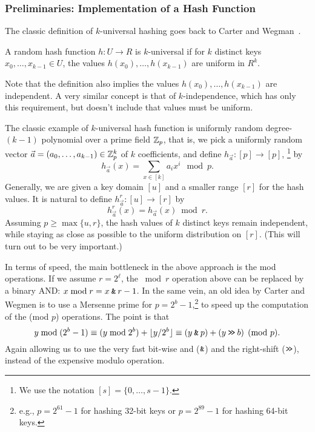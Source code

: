 \subsubsection{Preliminaries: Implementation of a Hash Function}
The classic definition of $k$-universal hashing
goes back to Carter and Wegman~\cite{wegman81kwise}.
\begin{definition}
   A random hash function $h:U\to R$ is $k$-universal if for $k$
   distinct keys $x_0,\ldots,x_{k-1}\in U$, the values
   $h(x_0),\ldots,h(x_{k-1})$ are uniform in $R^k$.
\end{definition}
\noindent
Note that the definition also implies the values 
$h(x_0),\ldots,h(x_{k-1})$ are independent.
A very similar concept is that of $k$-independence, which has only this requirement, but doesn't include that values must be uniform.

The classic example of $k$-universal
hash function is uniformly random degree-$(k-1)$ polynomial over a prime field
$\mathbb Z_p$, that is, we pick a uniformly random vector
$\vec a=(a_0,\ldots,a_{k-1})\in \mathbb Z_p^k$ of $k$ coefficients, and define
$h_{\vec a}:[p]\to[p]$,
\footnote{ We use the notation $[s]=\{0,\ldots,s-1\}$.  }
   by 
\[h_{\vec a}(x)=\sum_{x\in[k]}a_i x^i \mod p.\]
%
Generally, we are given a key domain $[u]$ and a smaller range $[r]$ for the hash values.
It is natural to define
$h^r_{\vec a}:[u]\to[r]$ by
\[h^r_{\vec a}(x)=h_{\vec a}(x)\bmod r.\]
Assuming $p\geq \max\{u,r\}$, the hash values of $k$ distinct keys remain independent,
while staying as close as possible to the uniform distribution on $[r]$.
(This will turn out to be very important.)

In terms of speed, the main bottleneck in the above approach is the mod operations.
If we assume $r=2^\ell$, the $\bmod r$ operation above can be replaced by a binary AND: $x \bmod r = x \mathbin{\texttt{\&}} r-1$.
In the same vein, an old idea by 
Carter and Wegmen \cite{carter77universal} is to use a
Mersenne prime for $p=2^b-1$,\footnote{e.g., $p=2^{61}-1$ for hashing 32-bit keys or
$p=2^{89}-1$ for hashing 64-bit keys.}
to speed up the computation of the (mod $p$) operations.
The point is that
\begin{equation}
   y \bmod (2^b-1)
   \equiv (y\bmod 2^{b}) + \lfloor {y/2^b} \rfloor
   \equiv (y \mathbin{\texttt{\&}} p) + (y \mathbin{\texttt{>\!>}} b)
   \pmod {p}.
   \label{eq:Mersenne}
\end{equation}
Again allowing us to use the very fast bit-wise {\sc and} ($\mathbin{\texttt{\&}}$) and the right-shift ($\mathbin{\texttt{>\!>}}$),
instead of the expensive modulo operation.


